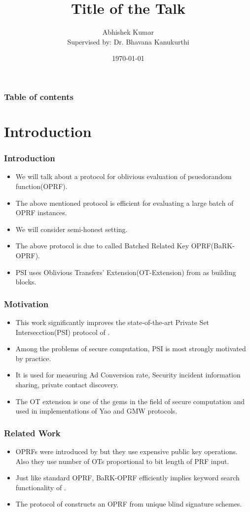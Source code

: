 \documentclass[hyperref={pdfpagelabels=false}]{beamer}
\title{Title of the Talk}
\author[Abhishek Kumar]{Abhishek Kumar\\{\small Supervised by: Dr. Bhavana Kanukurthi}}
\date{\today}
\begin{document}
\begin{frame}
\titlepage
\end{frame} 


\begin{frame}
\frametitle{Table of contents}
\tableofcontents
\end{frame} 


\section{Introduction} 
\begin{frame}
\frametitle{Introduction} 
\begin{itemize}
\item We will talk about a protocol for oblivious evaluation of psuedorandom function(OPRF). \pause
\item The above mentioned protocol is efficient for evaluating a large batch of OPRF instances. \pause
\item We will consider semi-honest setting.\pause
\item The above protocol is due to \cite{KKRT} called Batched Related Key OPRF(BaRK-OPRF).\pause
\item PSI uses Oblivious Transfers' Extension(OT-Extension) from \cite{KK} as building blocks.
\end{itemize}
\end{frame}

\begin{frame}
\frametitle{Motivation}
\begin{itemize}
\item This work significantly improves the state-of-the-art Private Set Intersecction(PSI) protocol of \cite{PSSZ}.\pause
\item Among the problems of secure computation, PSI is most strongly motivated by practice. \pause
\item It is used for measuring Ad Conversion rate, Security incident information sharing, private contact discovery.\pause
\item The \cite{IKNP} OT extension is one of the gems in the field of secure computation and used in implementations of Yao and GMW protocols.
\end{itemize}
 
\end{frame}

\begin{frame}
\frametitle{Related Work}
\begin{itemize}
\item OPRFs were introduced by \cite{FIPR} but they use expensive public key operations. Also they use number of OTs proportional to bit length of PRF input. \pause
\item Just like standard OPRF, BaRK-OPRF efficiently implies keyword search functionality of \cite{FIPR}. \pause
\item The protocol of \cite{CNS} constructs an OPRF from unique blind signature schemes.
\end{itemize}
\end{frame}
\end{document}
